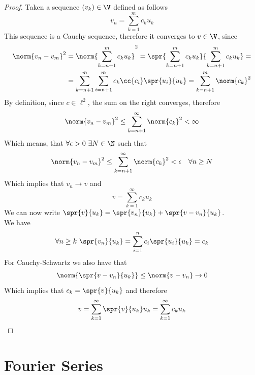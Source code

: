 \documentclass[../mmf.tex]{subfiles}
\begin{document}
\begin{proof}
	Taken a sequence $(v_k)\in\V$ defined as follows
	\begin{equation*}
		v_n=\sum_{k=1}^{m}c_ku_k
	\end{equation*}
	This sequence is a Cauchy sequence, therefore it converges to $v\in\V$, since
	\begin{equation*}
		\begin{aligned}
			\norm{v_n-v_m}^2&=\norm{\sum_{k=n+1}^{m}c_ku_k}^2=\spr{\sum_{k=n+1}^{m}c_ku_k}{\sum_{k=n+1}^{m}c_ku_k}=\\
			&=\sum_{k=n+1}^{m}\sum_{i=n+1}^{m}c_k\cc{c_i}\spr{u_i}{u_k}=\sum^{m}_{k=n+1}\norm{c_k}^2
		\end{aligned}
	\end{equation*}
	By definition, since $c\in\ell^2$, the sum on the right converges, therefore
	\begin{equation*}
		\norm{v_n-v_m}^2\le\sum_{k=n+1}^{\infty}\norm{c_k}^2<\infty
	\end{equation*}
	Which means, that $\forall\epsilon>0\ \exists N\in\N$ such that
	\begin{equation*}
		\norm{v_n-v_m}^2\le\sum_{k=n+1}^{\infty}\norm{c_k}^2<\epsilon\quad\forall n\ge N
	\end{equation*}
	Which implies that $v_n\to v$ and
	\begin{equation*}
		v=\sum_{k=1}^{\infty}c_ku_k
	\end{equation*}
	We can now write $\spr{v}{u_k}=\spr{v_n}{u_k}+\spr{v-v_n}{u_k}$.\\
	We have
	\begin{equation*}
		\forall n\ge k\ \spr{v_n}{u_k}=\sum_{i=1}^{n}c_i\spr{u_i}{u_k}=c_k
	\end{equation*}
	For Cauchy-Schwartz we also have that
	\begin{equation*}
		\norm{\spr{v-v_n}{u_k}}\le\norm{v-v_n}\to0
	\end{equation*}
	Which implies that $c_k=\spr{v}{u_k}$ and therefore
	\begin{equation*}
		v=\sum_{k=1}^{\infty}\spr{v}{u_k}u_k=\sum_{k=1}^{\infty}c_ku_k
	\end{equation*}
\end{proof}
\section{Fourier Series}
\end{document}
